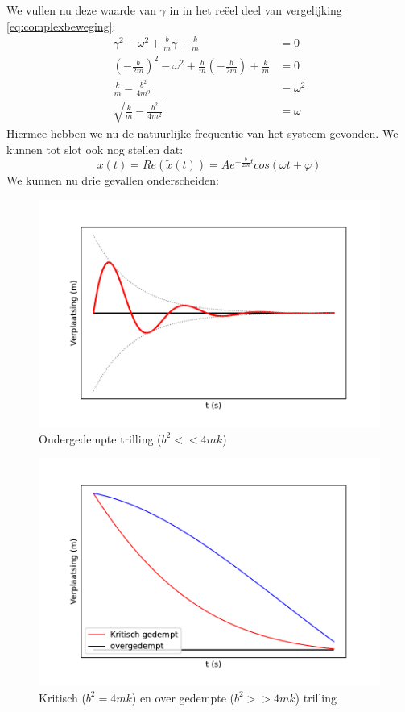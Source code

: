 \documentclass[a4paper,kul]{kulakarticle} %
\begin{document}
We vullen nu deze waarde van $\gamma$ in in het reëel deel van vergelijking \ref{eq:complexbeweging}:
\begin{align*}
	\gamma^2-\omega^2+\frac{b}{m}\gamma+\frac{k}{m} &=0\\
	(-\frac{b}{2m})^2-\omega^2+\frac{b}{m}(-\frac{b}{2m})+\frac{k}{m} &=0\\ 
	\frac{k}{m}-\frac{b^2}{4m^2}&=\omega^2\\
	\sqrt{\frac{k}{m}-\frac{b^2}{4m^2}}&=\omega
\end{align*}
Hiermee hebben we nu de natuurlijke frequentie van het systeem gevonden. We kunnen tot slot ook nog stellen dat:
\begin{equation*}
	x(t) = Re(\widetilde{x}(t)) = Ae^{-\frac{b}{2m} t}cos(\omega t + \varphi)
\end{equation*}
We kunnen nu drie gevallen onderscheiden: 
\begin{figure}[htbp]
	\centering
	\includegraphics[width=0.6\linewidth]{Ondergedempt}
	\caption[Ondergedempte trilling]{Ondergedempte trilling ($b^2 << 4mk$)}
	\label{fig:ondergedempt}
\end{figure}
\begin{figure}[htbp]
	\centering
	\includegraphics[width=0.6\linewidth]{Over_Kritisch_gedempt}
	\caption[Kritisch en over gedempte trilling]{Kritisch ($b^2 = 4mk$) en over gedempte ($b^2 >> 4mk$) trilling}
	\label{fig:overkritischgedempt}
\end{figure}
\end{document}
